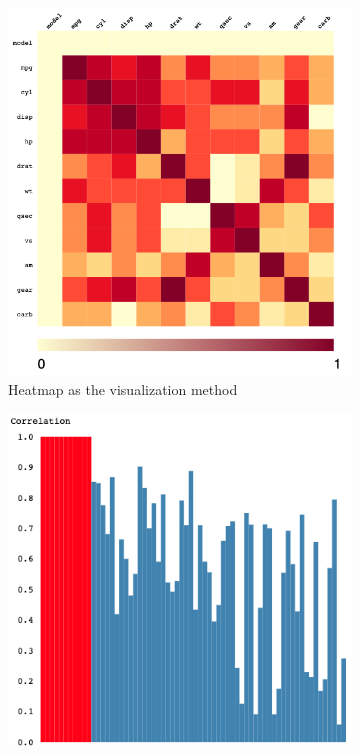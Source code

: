 \begin{figure}[h]
	\centering
	\begin{subfigure}[b]{0.32\textwidth}
		\centering
		\includegraphics[width=\textwidth]{pictures/correlationMatrix}
		\caption{Heatmap as the visualization method}
		\label{fig:Heatmap}
	\end{subfigure}
	\hfill
	\begin{subfigure}[b]{0.32\textwidth}
		\centering
		\includegraphics[width=\textwidth]{pictures/bg}

\end{subfigure}
\end{figure}
